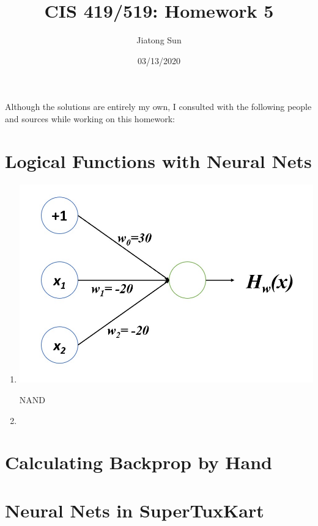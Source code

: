 \documentclass{article}
\title{CIS 419/519: Homework 5}
\author{Jiatong Sun}
\date{03/13/2020}
\begin{document}
    \maketitle
    \noindent
    Although the solutions are entirely my own, I consulted with the following people and sources while working on this homework: 
    
    \section{Logical Functions with Neural Nets}
        \begin{enumerate}[label=\alph*.]
            \item %
				\begin{minipage}[t]{\linewidth}
                	\captionsetup{type=figure}
                	\centering
                	\includegraphics[width=0.6\linewidth]
                					{images/Q1a.jpg}
                	\caption{NAND}      
        		\end{minipage} 
        		
        		           
            
            \item %
            
        \end{enumerate}
        
    \section{Calculating Backprop by Hand}
        
    \section{Neural Nets in SuperTuxKart}
       
\end{document}
